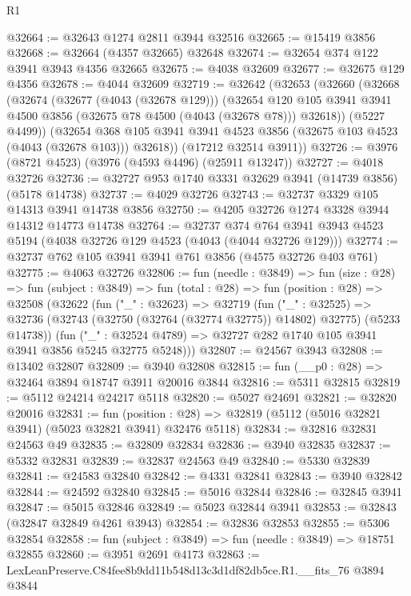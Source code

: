 \begin{lexlean}{R1}
\begin{coremodule}
@32664 := @32643 @1274 @2811 @3944 @32516
@32665 := @15419 @3856
@32668 := @32664 (@4357 @32665) @32648
@32674 := @32654 @374 @122 @3941 @3943 @4356 @32665
@32675 := @4038 @32609
@32677 := @32675 @129 @4356
@32678 := @4044 @32609
@32719 := @32642
    (@32653
      (@32660
        (@32668
          (@32674
            (@32677 (@4043 (@32678 @129)))
            (@32654
              @120
              @105
              @3941
              @3941
              @4500
              @3856
              (@32675 @78 @4500 (@4043 (@32678 @78)))
              @32618))
          (@5227 @4499))
        (@32654 @368 @105 @3941 @3941 @4523 @3856 (@32675 @103 @4523 (@4043 (@32678 @103))) @32618))
      (@17212 @32514 @3911))
@32726 := @3976 (@8721 @4523) (@3976 (@4593 @4496) (@25911 @13247))
@32727 := @4018 @32726
@32736 := @32727 @953 @1740 @3331 @32629 @3941 (@14739 @3856) (@5178 @14738)
@32737 := @4029 @32726
@32743 := @32737 @3329 @105 @14313 @3941 @14738 @3856
@32750 := @4205 @32726 @1274 @3328 @3944 @14312 @14773 @14738
@32764 := @32737
    @374
    @764
    @3941
    @3943
    @4523
    @5194
    (@4038 @32726 @129 @4523 (@4043 (@4044 @32726 @129)))
@32774 := @32737 @762 @105 @3941 @3941 @761 @3856 (@4575 @32726 @403 @761)
@32775 := @4063 @32726
@32806 := fun (needle : @3849) =>
  fun (size : @28) =>
  fun (subject : @3849) =>
  fun (total : @28) =>
  fun (position : @28) =>
  @32508
    (@32622
      (fun ("_" : @32623) =>
      @32719
        (fun ("_" : @32525) =>
        @32736 (@32743 (@32750 (@32764 (@32774 @32775)) @14802) @32775) (@5233 @14738))
        (fun ("_" : @32524 @4789) => @32727 @282 @1740 @105 @3941 @3941 @3856 @5245 @32775 @5248)))
@32807 := @24567 @3943
@32808 := @13402 @32807
@32809 := @3940 @32808
@32815 := fun (__p0 : @28) => @32464 @3894 @18747 @3911 @20016 @3844
@32816 := @5311 @32815
@32819 := @5112 @24214 @24217 @5118
@32820 := @5027 @24691
@32821 := @32820 @20016
@32831 := fun (position : @28) =>
  @32819 (@5112 (@5016 @32821 @3941) (@5023 @32821 @3941) @32476 @5118)
@32834 := @32816 @32831 @24563 @49
@32835 := @32809 @32834
@32836 := @3940 @32835
@32837 := @5332 @32831
@32839 := @32837 @24563 @49
@32840 := @5330 @32839
@32841 := @24583 @32840
@32842 := @4331 @32841
@32843 := @3940 @32842
@32844 := @24592 @32840
@32845 := @5016 @32844
@32846 := @32845 @3941
@32847 := @5015 @32846
@32849 := @5023 @32844 @3941
@32853 := @32843 (@32847 @32849 @4261 @3943)
@32854 := @32836 @32853
@32855 := @5306 @32854
@32858 := fun (subject : @3849) => fun (needle : @3849) => @18751 @32855
@32860 := @3951 @2691 @4173
@32863 := LexLeanPreserve.C84fee8b9dd11b548d13c3d1df82db5ce.R1.__fits_76 @3894 @3844

\end{coremodule}
\end{lexlean}
